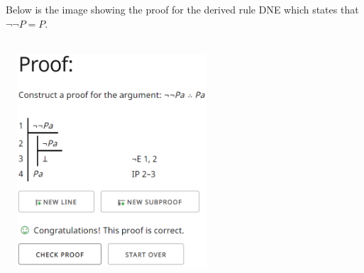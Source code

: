 \documentclass{article}
\begin{document}
\begin{flushleft}
Below is the image showing the proof for the derived rule DNE which states that $\neg\neg P = P$.\\
\begin{centering}\hspace*{1pt}\\\includegraphics[width=300px, height = 300px]{p1.png}\end{centering}
\end{flushleft}
\newpage
\end{document}
